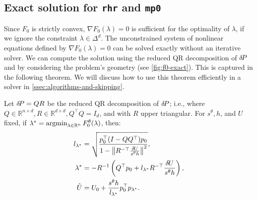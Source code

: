 \documentclass{article}
\begin{document}

\subsection{Exact solution for \texttt{rhr} and \texttt{mp0}}\label{ssec:exact-soln}

Since $F_0$ is strictly convex, $\nabla F_0(\lambda) = 0$ is
sufficient for the optimality of $\lambda$, if we ignore the
constraint $\lambda \in \Delta^d$. The unconstrained system of
nonlinear equations defined by $\nabla F_0(\lambda) = 0$ can be solved
exactly without an iterative solver. We can compute the solution using
the reduced QR decomposition of ${\delta \hspace{-0.14em} P}$ and by considering the
problem's geometry (see \cref{fig:f0-exact}). This is captured in the
following theorem. We will discuss how to use this theorem efficiently
in a solver in \cref{ssec:algorithms-and-skipping}.

\begin{theorem}\label{thm:f0-exact}
  Let ${\delta \hspace{-0.14em} P} = QR$ be the reduced QR decomposition of ${\delta \hspace{-0.14em} P}$; i.e.,
  where
  $Q \in \mathbb{R}^{n \times d}, R \in \mathbb{R}^{d \times d},
  Q^\top Q = I_d$, and with $R$ upper triangular. For $s^\theta, h$,
  and $U$ fixed, if
  $\lambda^* = \operatorname{argmin}_{\lambda \in \mathbb{R}^n}
  F_0^\theta(\lambda)$, then:
  \begin{align}
    l_{\lambda^*} &= \sqrt{\frac{p_0^\top {(I - QQ^\top)} p_0}{1 - \left\|R^{-\top} \frac{{\delta \hspace{-0.09em} U}}{s^\theta h}\right\|^2}},\label{eq:l-star-expression} \\
    \lambda^* &= -R^{-1} \left(Q^\top p_0 + l_{\lambda^*} R^{-\top} \frac{{\delta \hspace{-0.09em} U}}{s^\theta h}\right),\label{eq:f0-exact-lambda} \\ 
    \hat{U} &= U_0 + \frac{s^\theta h}{l_{\lambda^*}} p_0^\top p_{\lambda^*}.\label{eq:f0-exact}
  \end{align}
\end{theorem}
\end{document}
